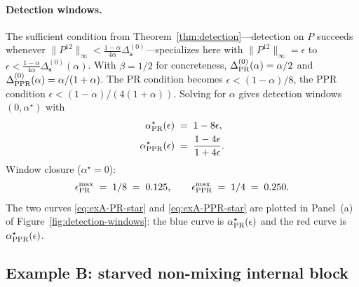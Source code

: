 \documentclass{article}
\theoremstyle{plain}
\theoremstyle{definition}
\newcommand{\arXivtag}[1][]{#1}
\begin{document}
\paragraph{Detection windows.} The sufficient condition from Theorem~\ref{thm:detection}---detection on $P$ succeeds whenever $\|P^{12}\|_\infty < \frac{1-\alpha}{4\alpha}\Delta^{(0)}_{\mathbf{s}}$---specializes here with $\|P^{12}\|_\infty = \epsilon$ to $\epsilon < \frac{1-\alpha}{4\alpha}\Delta^{(0)}_{\mathbf{s}}(\alpha)$. With $\beta = 1/2$ for concreteness, $\Delta^{(0)}_{\textnormal{PR}}(\alpha) = \alpha/2$ and $\Delta^{(0)}_{\textnormal{PPR}}(\alpha) = \alpha/(1+\alpha)$. The PR condition becomes $\epsilon < (1-\alpha)/8$, the PPR condition $\epsilon < (1-\alpha)/(4(1+\alpha))$. Solving for $\alpha$ gives detection windows $(0,\alpha^\star)$ with
	\begin{align}
		\alpha^\star_{\textnormal{PR}}(\epsilon) &\;=\; 1-8\epsilon, \label{eq:exA-PR-star}\\
		\alpha^\star_{\textnormal{PPR}}(\epsilon) &\;=\; \frac{1-4\epsilon}{1+4\epsilon}. \label{eq:exA-PPR-star}
	\end{align}
	Window closure ($\alpha^\star = 0$):
	\begin{equation}\label{eq:exA-epsmax}
		\epsilon^{\max}_{\textnormal{PR}} \;=\; 1/8 \;=\; 0.125, \qquad \epsilon^{\max}_{\textnormal{PPR}} \;=\; 1/4 \;=\; 0.250.
	\end{equation}
	The two curves \eqref{eq:exA-PR-star} and \eqref{eq:exA-PPR-star} are plotted in Panel~\arXivtag[(a)] of Figure~\ref{fig:detection-windows}: the blue curve is $\alpha^\star_{\textnormal{PR}}(\epsilon)$ and the red curve is $\alpha^\star_{\textnormal{PPR}}(\epsilon)$.

\subsection{Example B: starved non-mixing internal block}\label{app:2state-starved}
\end{document}
